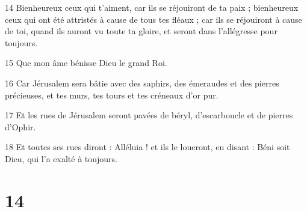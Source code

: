 \par 14 Bienheureux ceux qui t'aiment, car ils se réjouiront de ta paix ; bienheureux ceux qui ont été attristés à cause de tous tes fléaux ; car ils se réjouiront à cause de toi, quand ils auront vu toute ta gloire, et seront dans l'allégresse pour toujours.
\par 15 Que mon âme bénisse Dieu le grand Roi.
\par 16 Car Jérusalem sera bâtie avec des saphirs, des émeraudes et des pierres précieuses, et tes murs, tes tours et tes créneaux d'or pur.
\par 17 Et les rues de Jérusalem seront pavées de béryl, d'escarboucle et de pierres d'Ophir.
\par 18 Et toutes ses rues diront : Alléluia ! et ils le loueront, en disant : Béni soit Dieu, qui l'a exalté à toujours.

\chapter{14}

